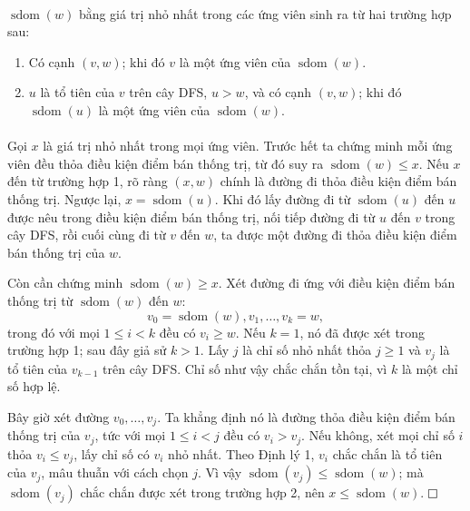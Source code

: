 \documentclass[11pt]{article}
\newcommand{\proofbox}{\ensuremath{\vcenter{\hrule height 0.45pt
  \hbox{\vrule width 0.45pt height 6pt\kern 6pt\vrule width 0.45pt}
  \hrule height 0.45pt}}}
\begin{document}
\paragraph{}
\(\operatorname{sdom}(w)\) bằng giá trị nhỏ nhất trong các ứng viên sinh ra từ
hai trường hợp sau:

\begin{enumerate}
  \item Có cạnh \((v,w)\); khi đó \(v\) là một ứng viên của
  \(\operatorname{sdom}(w)\).
  \item \(u\) là tổ tiên của \(v\) trên cây DFS, \(u>w\), và có cạnh \((v,w)\);
  khi đó \(\operatorname{sdom}(u)\) là một ứng viên của
  \(\operatorname{sdom}(w)\).
\end{enumerate}

\paragraph{}
Gọi \(x\) là giá trị nhỏ nhất trong mọi ứng viên. Trước hết ta chứng minh mỗi
ứng viên đều thỏa điều kiện điểm bán thống trị, từ đó suy ra
\(\operatorname{sdom}(w)\le x\). Nếu \(x\) đến từ trường hợp 1, rõ ràng
\((x,w)\) chính là đường đi thỏa điều kiện điểm bán thống trị. Ngược lại,
\(x=\operatorname{sdom}(u)\). Khi đó lấy đường đi từ \(\operatorname{sdom}(u)\)
đến \(u\) được nêu trong điều kiện điểm bán thống trị, nối tiếp đường đi từ
\(u\) đến \(v\) trong cây DFS, rồi cuối cùng đi từ \(v\) đến \(w\), ta được một
đường đi thỏa điều kiện điểm bán thống trị của \(w\).

Còn cần chứng minh \(\operatorname{sdom}(w)\ge x\). Xét đường đi ứng với điều
kiện điểm bán thống trị từ \(\operatorname{sdom}(w)\) đến \(w\):
\[
v_0=\operatorname{sdom}(w),v_1,\ldots,v_k=w,
\]
trong đó với mọi \(1\le i<k\) đều có \(v_i\ge w\). Nếu \(k=1\), nó đã được xét
trong trường hợp 1; sau đây giả sử \(k>1\). Lấy \(j\) là chỉ số nhỏ nhất thỏa
\(j\ge 1\) và \(v_j\) là tổ tiên của \(v_{k-1}\) trên cây DFS. Chỉ số như vậy
chắc chắn tồn tại, vì \(k\) là một chỉ số hợp lệ.

Bây giờ xét đường \(v_0,\ldots,v_j\). Ta khẳng định nó là đường thỏa điều kiện
điểm bán thống trị của \(v_j\), tức với mọi \(1\le i<j\) đều có \(v_i>v_j\).
Nếu không, xét mọi chỉ số \(i\) thỏa \(v_i\le v_j\), lấy chỉ số có \(v_i\) nhỏ
nhất. Theo Định lý 1, \(v_i\) chắc chắn là tổ tiên của \(v_j\), mâu thuẫn với
cách chọn \(j\). Vì vậy \(\operatorname{sdom}(v_j)\le \operatorname{sdom}(w)\);
mà \(\operatorname{sdom}(v_j)\) chắc chắn được xét trong trường hợp 2, nên
\(x\le \operatorname{sdom}(w)\). \proofbox
\end{document}
